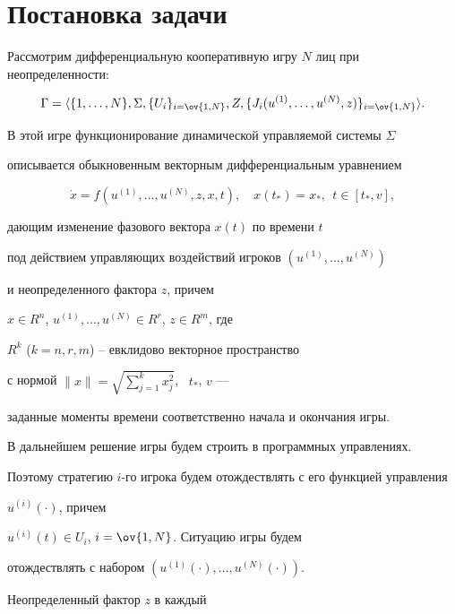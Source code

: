 \section{Постановка задачи} 


 


Рассмотрим дифференциальную кооперативную игру $N$ лиц при неопределенности: 


$$ 


\Gamma=\la\{1,\dotsc,N\},\Sigma,\{U_i\}_{i=\ov{1,N}}, 


Z,\{J_i(u^{(1)},\dotsc,u^{(N)},z)\}_{i=\ov{1,N}}\ra. 


$$ 


В этой игре функционирование динамической управляемой системы $\Sigma$ 


описывается обыкновенным векторным дифференциальным уравнением 


\begin{equation} 


\Dot x=f(u^{(1)},\dotsc,u^{(N)},z,x,t),\quad 


x(t_*)=x_*,\ \ t\in[t_*,v], 


\end{equation} 


дающим изменение фазового вектора $x(t)$ по времени $t$


под действием управляющих воздействий игроков $(u^{(1)},\dotsc,u^{(N)})$ 


и неопределенного фактора $z$, причем 


$x\in R^n$, $u^{(1)},\dotsc, u^{(N)}\in R^r$, $z\in R^m$, где


$R^k$ ($k=n,r,m$) -- евклидово векторное пространство


с нормой $\|x\|=\sqrt{\sum\limits^k_{j=1}x_j^2}$, \ $t_*$, $v$ --- 


заданные моменты времени соответственно начала и окончания игры. 


 


В дальнейшем решение игры будем строить в программных управлениях.


Поэтому стратегию $i$-го игрока будем отождествлять с его функцией управления 


$u^{(i)}(\cdot)$, причем 


$u^{(i)}(t)\in U_i$, $i=\ov{1,N}$. Ситуацию игры будем 


отождествлять с набором $(u^{(1)}(\cdot),\dotsc,u^{(N)}(\cdot))$. 


Неопределенный фактор $z$ в каждый 


